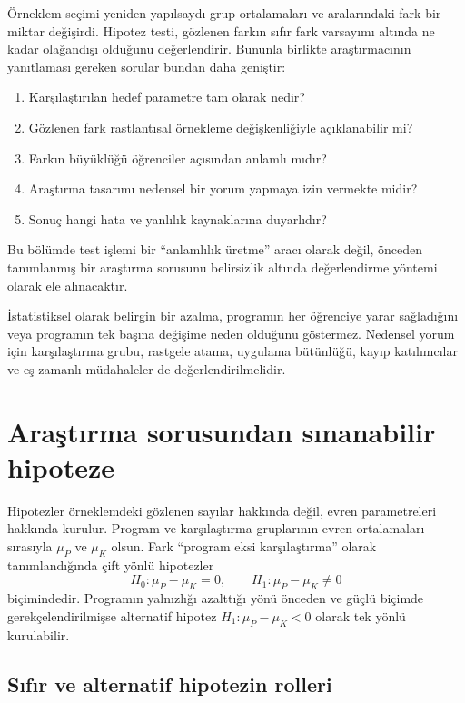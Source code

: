Örneklem seçimi yeniden yapılsaydı grup ortalamaları ve aralarındaki fark bir
miktar değişirdi. Hipotez testi, gözlenen farkın sıfır fark varsayımı altında
ne kadar olağandışı olduğunu değerlendirir. Bununla birlikte araştırmacının
yanıtlaması gereken sorular bundan daha geniştir:

\begin{enumerate}
  \item Karşılaştırılan hedef parametre tam olarak nedir?
  \item Gözlenen fark rastlantısal örnekleme değişkenliğiyle açıklanabilir mi?
  \item Farkın büyüklüğü öğrenciler açısından anlamlı mıdır?
  \item Araştırma tasarımı nedensel bir yorum yapmaya izin vermekte midir?
  \item Sonuç hangi hata ve yanlılık kaynaklarına duyarlıdır?
\end{enumerate}


Bu bölümde test işlemi bir ``anlamlılık üretme'' aracı olarak değil, önceden
tanımlanmış bir araştırma sorusunu belirsizlik altında değerlendirme yöntemi
olarak ele alınacaktır.

\begin{researchbox}
İstatistiksel olarak belirgin bir azalma, programın her öğrenciye yarar
sağladığını veya programın tek başına değişime neden olduğunu göstermez.
Nedensel yorum için karşılaştırma grubu, rastgele atama, uygulama bütünlüğü,
kayıp katılımcılar ve eş zamanlı müdahaleler de değerlendirilmelidir.
\end{researchbox}

\section{Araştırma sorusundan sınanabilir hipoteze}

Hipotezler örneklemdeki gözlenen sayılar hakkında değil, evren parametreleri
hakkında kurulur. Program ve karşılaştırma gruplarının evren ortalamaları
sırasıyla $\mu_P$ ve $\mu_K$ olsun. Fark ``program eksi karşılaştırma'' olarak
tanımlandığında çift yönlü hipotezler
\[
H_0:\mu_P-\mu_K=0,
\qquad
H_1:\mu_P-\mu_K\neq0
\]
biçimindedir. Programın yalnızlığı azalttığı yönü önceden ve güçlü biçimde
gerekçelendirilmişse alternatif hipotez $H_1:\mu_P-\mu_K<0$ olarak tek yönlü
kurulabilir.

\subsection{Sıfır ve alternatif hipotezin rolleri}

